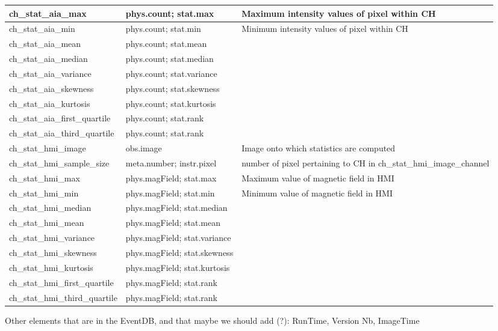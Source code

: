 \documentclass{article}
\begin{document}
\begin{longtable}{|p{5cm}|p{2.5cm}|p{6.5cm}|}
\hline
ch\_stat\_aia\_max             & phys.count; stat.max         & Maximum intensity values of pixel within CH \\
\hline
ch\_stat\_aia\_min             & phys.count; stat.min         & Minimum intensity values of pixel within CH \\
\hline
ch\_stat\_aia\_mean            & phys.count; stat.mean        & \\
\hline
ch\_stat\_aia\_median          & phys.count; stat.median      & \\
\hline
ch\_stat\_aia\_variance        & phys.count; stat.variance    & \\
\hline
ch\_stat\_aia\_skewness        & phys.count; stat.skewness        & \\
\hline
ch\_stat\_aia\_kurtosis        & phys.count; stat.kurtosis    & \\
\hline
ch\_stat\_aia\_first\_quartile & phys.count; stat.rank        & \\
\hline
ch\_stat\_aia\_third\_quartile & phys.count; stat.rank        & \\
\hline
ch\_stat\_hmi\_image           & obs.image                    & Image onto which statistics are computed \\
\hline
ch\_stat\_hmi\_sample\_size    & meta.number; instr.pixel     & number of pixel pertaining to CH in ch\_stat\_hmi\_image\_channel \\
\hline
ch\_stat\_hmi\_max             & phys.magField; stat.max      & Maximum value of magnetic field in HMI \\
\hline
ch\_stat\_hmi\_min             & phys.magField; stat.min      & Minimum value of magnetic field in HMI \\
\hline
ch\_stat\_hmi\_median          & phys.magField; stat.median   & \\
\hline
ch\_stat\_hmi\_mean            & phys.magField; stat.mean     & \\
\hline
ch\_stat\_hmi\_variance        & phys.magField; stat.variance & \\
\hline
ch\_stat\_hmi\_skewness        & phys.magField; stat.skewness     & \\
\hline
ch\_stat\_hmi\_kurtosis        & phys.magField; stat.kurtosis & \\
\hline
ch\_stat\_hmi\_first\_quartile & phys.magField; stat.rank     & \\
\hline
ch\_stat\_hmi\_third\_quartile & phys.magField; stat.rank     & \\
\hline
\end{longtable}
Other elements that are in the EventDB, and that maybe we should add (?):
RunTime, Version Nb, ImageTime
\end{document}
